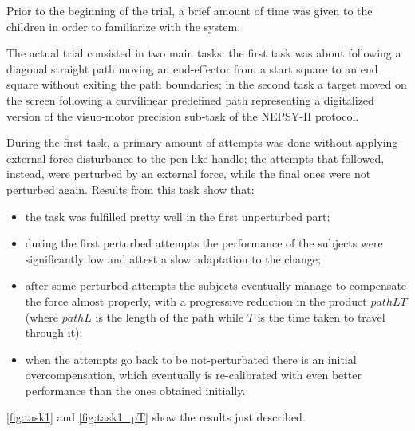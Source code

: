 \documentclass[12pt,journal,draftclsnofoot,onecolumn]{IEEEtran}
\begin{document}
Prior to the beginning of the trial, a brief amount of time was given to the children in order to familiarize with the system.

The actual trial consisted in two main tasks: the first task was about following a diagonal straight path moving an end-effector from a start square to an end square without exiting the path boundaries; in the second task a target moved on the screen following a curvilinear predefined path representing a digitalized version of the visuo-motor precision sub-task of the NEPSY-II protocol.

During the first task, a primary amount of attempts was done without applying external force disturbance to the pen-like handle; the attempts that followed, instead, were perturbed by an external force, while the final ones were not perturbed again. Results from this task show that:
\begin{itemize}
\item the task was fulfilled pretty well in the first unperturbed part;
\item during the first perturbed attempts the performance of the subjects were significantly low and attest a slow adaptation to the change;
\item after some perturbed attempts the subjects eventually manage to compensate the force almost properly, with a progressive reduction in the product $pathL \dot T$ (where $pathL$ is the length of the path while $T$ is the time taken to travel through it);
\item when the attempts go back to be not-perturbated there is an initial overcompensation, which eventually is re-calibrated with even better performance than the ones obtained initially.
\end{itemize}

\autoref{fig:task1} and \autoref{fig:task1_pT} show the results just described.
\end{document}
